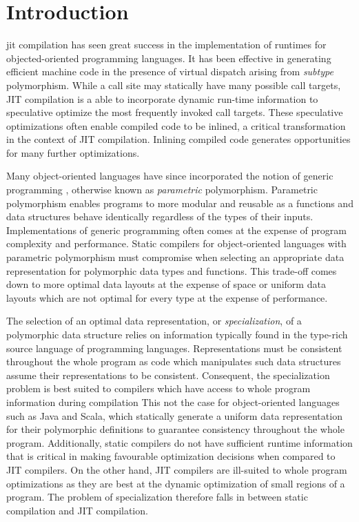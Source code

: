 \chapter{Introduction}

\acrfull{jit} compilation has seen great success in the implementation of runtimes for  objected-oriented programming languages.
It has been effective in generating efficient machine code in the presence of virtual dispatch arising from \textit{subtype} polymorphism.
While a call site may statically have many possible call targets, JIT compilation is a able to incorporate dynamic run-time information to speculative optimize the most frequently invoked call targets.
These speculative optimizations often enable compiled code to be inlined, a critical transformation in the context of JIT compilation.
Inlining compiled code generates opportunities for many further optimizations.

Many object-oriented languages have since incorporated the notion of generic programming , otherwise known as \textit{parametric} polymorphism.
Parametric polymorphism enables programs to more modular and reusable as a functions and data structures behave identically\cite{tapl} regardless of the types of their inputs.
Implementations of generic programming often comes at the expense of program complexity and performance.
Static compilers for object-oriented languages with parametric polymorphism must compromise when selecting an appropriate data representation for polymorphic data types and functions.
This trade-off comes down to more optimal data layouts at the expense of space or uniform data layouts which are not optimal for every type at the expense of performance.

The selection of an optimal data representation, or \textit{specialization}, of a polymorphic data structure relies on information typically found in the type-rich source language of programming languages.
Representations must be consistent throughout the whole program as code which manipulates such data structures assume their representations to be consistent.
Consequent, the specialization problem is best suited to compilers which have access to whole program information during compilation
This not the case for object-oriented languages such as Java and Scala, which statically generate a uniform data representation for their polymorphic definitions to guarantee consistency throughout the whole program. 
Additionally, static compilers do not have sufficient runtime information that is critical in making favourable optimization decisions when compared to JIT compilers.
On the other hand, JIT compilers are ill-suited to whole program optimizations as they are best at the dynamic optimization of small regions of a program.
The problem of specialization therefore falls in between static compilation and JIT compilation.

